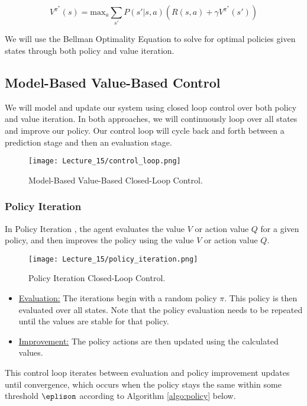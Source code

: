 \documentclass[11pt]{article}
\begin{document}
\begin{equation}
    V^{\pi^*}(s) = \text{max}_a \sum_{s'} P(s'|s,a)(R(s,a)+\gamma V^{\pi^*}(s'))
\end{equation}

We will use the Bellman Optimality Equation to solve for optimal policies given states through both policy and value iteration. 

\subsection{Model-Based Value-Based Control}

We will model and update our system using closed loop control over both policy and value iteration. In both approaches, we will continuously loop over all states and improve our policy. Our control loop will cycle back and forth between a prediction stage and then an evaluation stage. 

\begin{figure}[!ht]
\centering
\texttt{[image: Lecture\_15/control\_loop.png]}
\caption{Model-Based Value-Based Closed-Loop Control.}
\end{figure}

\subsubsection{Policy Iteration}
In Policy Iteration \cite{Bel}, the agent evaluates the value $V$ or action value $Q$ for a given policy, and then improves the policy using the value $V$ or action value $Q$. 

\begin{figure}[!ht]
\centering
\texttt{[image: Lecture\_15/policy\_iteration.png]}
\caption{Policy Iteration Closed-Loop Control.}
\end{figure}

\begin{itemize}
    \item \underline{Evaluation:}
    The iterations begin with a random policy $\pi$. This policy is then evaluated over all states. Note that the policy evaluation needs to be repeated until the values are stable for that policy. 
    \item \underline{Improvement:}
    The policy actions are then updated using the calculated values.
\end{itemize}

This control loop iterates between evaluation and policy improvement updates until convergence, which occurs when the policy stays the same within some threshold $\eplison$ according to Algorithm \ref{algo:policy} below.
\end{document}
